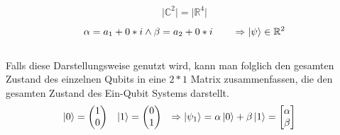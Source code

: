 \documentclass[12pt]{report}
\begin{document}
	\begin{align*} \vert \mathbb{C}^2 \vert = \vert \mathbb{R}^4 \vert \end{align*}
	\begin{align*}  \alpha = a_1+0*i \wedge \beta = a_2+0*i \qquad \Rightarrow \ket{\psi} \in \mathbb{R}^2 
	\end{align*} \vspace{-0.5cm} \\	
Falls diese Darstellungsweise genutzt wird, kann man folglich den gesamten Zustand des einzelnen Qubits in eine $2*1$ Matrix zusammenfassen, die den gesamten Zustand des Ein-Qubit Systems darstellt.
	\begin{align*}
	\ket{0} &= \begin{pmatrix} 1 \\ 0 \end{pmatrix} & \ket{1} &= \begin{pmatrix} 0 \\ 1\end{pmatrix}
	& \Rightarrow \ket{\psi_{1}} &= \alpha\ket{0} + \beta\ket{1} = 
	\begin{bmatrix} \alpha \\ \beta \end{bmatrix}
	\end{align*}
	
\end{document}
